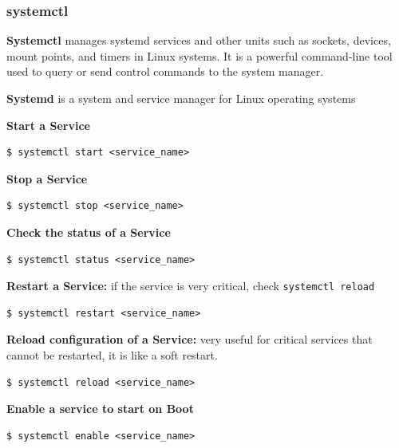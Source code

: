 \documentclass{article}
\newenvironment{codetemplate}[1][]{%
  \mybasecolorbox[#1]
  \itshape
}{%
  \endmybasecolorbox
}
\begin{document}
\subsubsection{systemctl}
\textbf{Systemctl} manages systemd services and other units such as sockets, devices, mount points, and timers in Linux systems. It is a powerful command-line tool used to query or send control commands to the system manager.

\textbf{Systemd} is a system and service manager for Linux operating systems

\textbf{Start a Service}
\begin{codetemplate}{}
\begin{verbatim}
$ systemctl start <service_name>
\end{verbatim}
\end{codetemplate}

\textbf{Stop a Service}
\begin{codetemplate}{}
\begin{verbatim}
$ systemctl stop <service_name>
\end{verbatim}
\end{codetemplate}

\textbf{Check the status of a Service}
\begin{codetemplate}{}
\begin{verbatim}
$ systemctl status <service_name>
\end{verbatim}
\end{codetemplate}

\textbf{Restart a Service:} if the service is very critical, check \verb|systemctl reload|
\begin{codetemplate}{}
\begin{verbatim}
$ systemctl restart <service_name>
\end{verbatim}
\end{codetemplate}

\textbf{Reload configuration of a Service:} very useful for critical services that cannot be restarted, it is like a soft restart.
\begin{codetemplate}{}
\begin{verbatim}
$ systemctl reload <service_name>
\end{verbatim}
\end{codetemplate}

\textbf{Enable a service to start on Boot}
\begin{codetemplate}{}
\begin{verbatim}
$ systemctl enable <service_name>
\end{verbatim}
\end{codetemplate}
\end{document}
